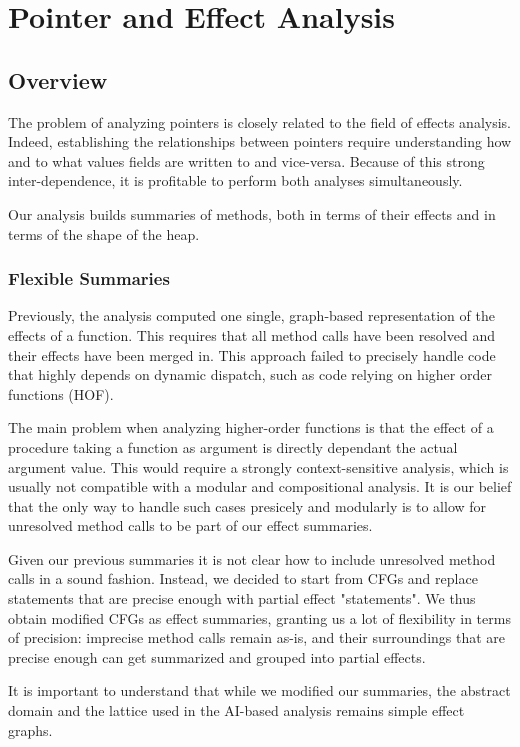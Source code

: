 \documentclass[a4paper]{article}
\begin{document}
\section{Pointer and Effect Analysis}
\subsection{Overview}
The problem of analyzing pointers is closely related to the field of effects
analysis. Indeed, establishing the relationships between pointers require
understanding how and to what values fields are written to and vice-versa.
Because of this strong inter-dependence, it is profitable to perform both
analyses simultaneously.

Our analysis builds summaries of methods, both in terms of their effects and in
terms of the shape of the heap.

\subsubsection{Flexible Summaries}
Previously, the analysis computed one single, graph-based representation of the
effects of a function. This requires that all method calls have been resolved
and their effects have been merged in. This approach failed to precisely handle
code that highly depends on dynamic dispatch, such as code relying on higher
order functions (HOF).

The main problem when analyzing higher-order functions is that the effect of a
procedure taking a function as argument is directly dependant the actual
argument value. This would require a strongly context-sensitive analysis, which
is usually not compatible with a modular and compositional analysis. It is our
belief that the only way to handle such cases presicely and modularly is to
allow for unresolved method calls to be part of our effect summaries.

Given our previous summaries it is not clear how to include unresolved method
calls in a sound fashion. Instead, we decided to start from CFGs and replace
statements that are precise enough with partial effect "statements". We thus
obtain modified CFGs as effect summaries, granting us a lot of flexibility in
terms of precision: imprecise method calls remain as-is, and their surroundings
that are precise enough can get summarized and grouped into partial effects.

It is important to understand that while we modified our summaries, the
abstract domain and the lattice used in the AI-based analysis remains simple
effect graphs.
\end{document}
